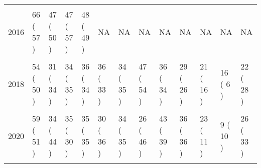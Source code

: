 \documentclass[
]{article}
\begin{document}
\begin{table}
\begin{tabular}[t]{rllllllllllll}
\cellcolor{gray!6}{2015} & \cellcolor{gray!6}{37 ( 39 )} & \cellcolor{gray!6}{24 ( 27 )} & \cellcolor{gray!6}{NA} & \cellcolor{gray!6}{49 ( 49 )} & \cellcolor{gray!6}{NA} & \cellcolor{gray!6}{NA} & \cellcolor{gray!6}{NA} & \cellcolor{gray!6}{NA} & \cellcolor{gray!6}{NA} & \cellcolor{gray!6}{NA} & \cellcolor{gray!6}{NA} & \cellcolor{gray!6}{NA}\\
2016 & 66 ( 57 ) & 47 ( 50 ) & 47 ( 57 ) & 48 ( 49 ) & NA & NA & NA & NA & NA & NA & NA & NA\\
\addlinespace
\cellcolor{gray!6}{2017} & \cellcolor{gray!6}{59 ( 48 )} & \cellcolor{gray!6}{35 ( 37 )} & \cellcolor{gray!6}{44 ( 46 )} & \cellcolor{gray!6}{48 ( 48 )} & \cellcolor{gray!6}{38 ( 34 )} & \cellcolor{gray!6}{44 ( 43 )} & \cellcolor{gray!6}{13 ( 9 )} & \cellcolor{gray!6}{15 ( 14 )} & \cellcolor{gray!6}{17 ( 17 )} & \cellcolor{gray!6}{14 ( 7 )} & \cellcolor{gray!6}{9 ( 7 )} & \cellcolor{gray!6}{10 ( 21 )}\\
2018 & 54 ( 50 ) & 31 ( 34 ) & 34 ( 35 ) & 36 ( 34 ) & 36 ( 33 ) & 34 ( 35 ) & 47 ( 54 ) & 36 ( 34 ) & 29 ( 26 ) & 21 ( 16 ) & 16 ( 6 ) & 22 ( 28 )\\
\cellcolor{gray!6}{2019} & \cellcolor{gray!6}{47 ( 46 )} & \cellcolor{gray!6}{35 ( 38 )} & \cellcolor{gray!6}{34 ( 32 )} & \cellcolor{gray!6}{36 ( 39 )} & \cellcolor{gray!6}{34 ( 35 )} & \cellcolor{gray!6}{32 ( 36 )} & \cellcolor{gray!6}{50 ( 60 )} & \cellcolor{gray!6}{41 ( 40 )} & \cellcolor{gray!6}{25 ( 27 )} & \cellcolor{gray!6}{19 ( 12 )} & \cellcolor{gray!6}{12 ( 13 )} & \cellcolor{gray!6}{24 ( 23 )}\\
2020 & 59 ( 51 ) & 34 ( 44 ) & 35 ( 30 ) & 35 ( 35 ) & 30 ( 36 ) & 34 ( 35 ) & 26 ( 46 ) & 43 ( 39 ) & 36 ( 36 ) & 23 ( 11 ) & 9 ( 10 ) & 26 ( 33 )\\
\cellcolor{gray!6}{2021} & \cellcolor{gray!6}{51 ( 46 )} & \cellcolor{gray!6}{38 ( 41 )} & \cellcolor{gray!6}{32 ( 36 )} & \cellcolor{gray!6}{33 ( 35 )} & \cellcolor{gray!6}{37 ( 35 )} & \cellcolor{gray!6}{35 ( 33 )} & \cellcolor{gray!6}{28 ( 41 )} & \cellcolor{gray!6}{38 ( 31 )} & \cellcolor{gray!6}{31 ( 35 )} & \cellcolor{gray!6}{20 ( 12 )} & \cellcolor{gray!6}{6 ( 8 )} & \cellcolor{gray!6}{23 ( 28 )}\\
\bottomrule
\end{tabular}
\end{table}

\FloatBarrier
\newpage
\end{document}
